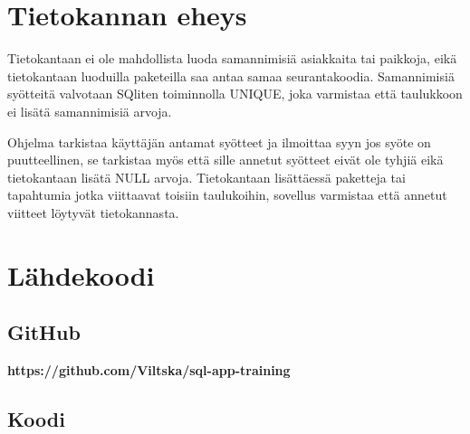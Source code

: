 \documentclass[12pt,a4paper]{article}
\begin{document}
\newpage
\section{Tietokannan eheys}
Tietokantaan ei ole mahdollista luoda samannimisiä asiakkaita tai paikkoja, eikä tietokantaan luoduilla paketeilla saa antaa samaa seurantakoodia. Samannimisiä syötteitä valvotaan SQliten toiminnolla UNIQUE, joka varmistaa että taulukkoon ei lisätä samannimisiä arvoja. 

Ohjelma tarkistaa käyttäjän antamat syötteet ja ilmoittaa syyn jos syöte on puutteellinen, se tarkistaa myös että sille annetut syötteet eivät ole tyhjiä eikä tietokantaan lisätä NULL arvoja. Tietokantaan lisättäessä paketteja tai tapahtumia jotka viittaavat toisiin taulukoihin, sovellus varmistaa että annetut viitteet löytyvät tietokannasta.





\newpage
\section{Lähdekoodi}
\subsection*{GitHub}
\textbf{https://github.com/Viltska/sql-app-training}
\subsection*{Koodi}


\newpage
\end{document}
